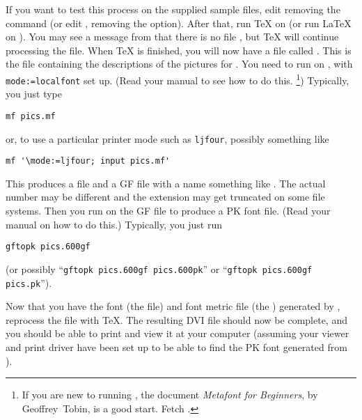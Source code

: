 \documentclass[letterpaper]{article}
\begin{document}
If you want to test this process on the supplied sample files, edit
 removing the  command (or edit
, removing the  option). After that,
run \TeX{} on  (or run \LaTeX{} on
). You may see a message from \mfp{} that there is
no file , but \TeX{} will continue processing the file.
When \TeX{} is finished, you will now have a file called .
This is the \MF{} file containing the descriptions of the pictures for
. You need to run \MF{} on , with
\texttt{mode:=localfont} set up.
(Read your \MF{} manual to see how to do this.%
    \footnote{If you are new to running \MF{}, the document
    \textit{Metafont for Beginners}, by Geoffrey~Tobin, is a good
    start. Fetch .}) %
Typically, you just type
\begin{verbatim}
mf pics.mf
\end{verbatim}
or, to use a particular printer mode such as \texttt{ljfour}, possibly
something like
\begin{verbatim}
mf '\mode:=ljfour; input pics.mf'
\end{verbatim}
This produces a  file and a GF file with a name something
like . The actual number may be different and the
extension may get truncated on some file systems. Then you run
 on the GF file to produce a PK font file. (Read your
 manual on how to do this.) Typically, you just run
\begin{verbatim}
gftopk pics.600gf
\end{verbatim}
(or possibly ``\verb$gftopk pics.600gf pics.600pk$'' or
``\verb$gftopk pics.600gf pics.pk$'').

Now that you have the font (the  file) and font metric file (the
) generated by \MF{}, reprocess the file 
with \TeX{}. The resulting DVI file should now be complete, and you should
be able to print and view it at your computer (assuming your viewer and
print driver have been set up to be able to find the PK font generated
from ).
\end{document}
